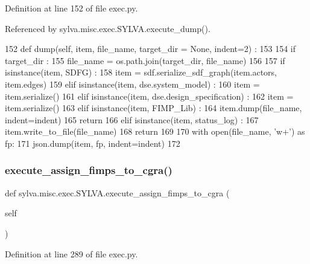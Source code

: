 Definition at line 152 of file exec.\+py.



Referenced by sylva.\+misc.\+exec.\+S\+Y\+L\+V\+A.\+execute\+\_\+dump().


\begin{DoxyCode}
152   \textcolor{keyword}{def }dump(self, item, file\_name, target\_dir = None, indent=2) :
153 
154     \textcolor{keywordflow}{if} target\_dir :
155       file\_name = os.path.join(target\_dir, file\_name)
156 
157     \textcolor{keywordflow}{if} isinstance(item, SDFG) :
158       item = sdf.serialize\_sdf\_graph(item.actors, item.edges)
159     \textcolor{keywordflow}{elif} isinstance(item, dse.system\_model) :
160       item = item.serialize()
161     \textcolor{keywordflow}{elif} isinstance(item, dse.design\_specification) :
162       item = item.serialize()
163     \textcolor{keywordflow}{elif} isinstance(item, FIMP\_Lib) :
164       item.dump(file\_name, indent=indent)
165       \textcolor{keywordflow}{return}
166     \textcolor{keywordflow}{elif} isinstance(item, status\_log) :
167       item.write\_to\_file(file\_name)
168       \textcolor{keywordflow}{return}
169 
170     with open(file\_name, \textcolor{stringliteral}{'w+'}) \textcolor{keyword}{as} fp:
171       json.dump(item, fp, indent=indent)
172 
\end{DoxyCode}
\mbox{\label{classsylva_1_1misc_1_1exec_1_1_s_y_l_v_a_ae0feb4c294c27982ca22fcae8bd040f8}} 
\subsubsection{\texorpdfstring{execute\+\_\+assign\+\_\+fimps\+\_\+to\+\_\+cgra()}{execute\_assign\_fimps\_to\_cgra()}}
{\footnotesize\ttfamily def sylva.\+misc.\+exec.\+S\+Y\+L\+V\+A.\+execute\+\_\+assign\+\_\+fimps\+\_\+to\+\_\+cgra (\begin{DoxyParamCaption}\item[{}]{self }\end{DoxyParamCaption})}



Definition at line 289 of file exec.\+py.



